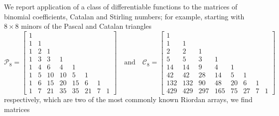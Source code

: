 We report application of a class of differentiable  functions
to the matrices of binomial coefficients, Catalan and Stirling numbers; for
example, starting with $8 \times 8$ minors of the Pascal and Catalan triangles
\begin{displaymath}
\mathcal{P}_{8}=\left[\begin{matrix}1 &   &   &   &   &   &   &  \\1 & 1 &   &   &   &   &   &  \\1 & 2 & 1 &   &   &   &   &  \\1 & 3 & 3 & 1 &   &   &   &  \\1 & 4 & 6 & 4 & 1 &   &   &  \\1 & 5 & 10 & 10 & 5 & 1 &   &  \\1 & 6 & 15 & 20 & 15 & 6 & 1 &  \\1 & 7 & 21 & 35 & 35 & 21 & 7 & 1\end{matrix}\right]
\quad\text{and}\quad
\mathcal{C}_{8}=\left[\begin{matrix}1 &   &   &   &   &   &   &  \\1 & 1 &   &   &   &   &   &  \\2 & 2 & 1 &   &   &   &   &  \\5 & 5 & 3 & 1 &   &   &   &  \\14 & 14 & 9 & 4 & 1 &   &   &  \\42 & 42 & 28 & 14 & 5 & 1 &   &  \\132 & 132 & 90 & 48 & 20 & 6 & 1 &  \\429 & 429 & 297 & 165 & 75 & 27 & 7 & 1\end{matrix}\right]
\end{displaymath}
respectively, which are two of the most commonly known Riordan arrays, we find matrices
